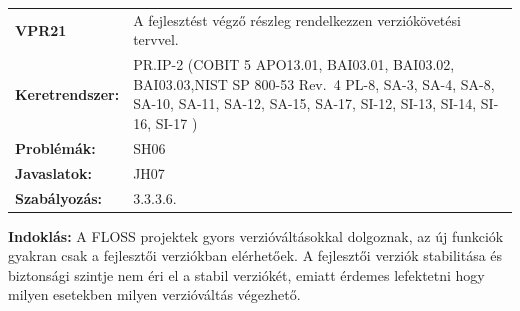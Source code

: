 \documentclass[12pt,magyar,a4paper,oneside]{scrreprt}
\begin{document}
\begin{longtable}[]{@{}ll@{}}
\toprule
\endhead
\begin{minipage}[t]{0.16\columnwidth}\raggedright
\textbf{VPR21}\strut
\end{minipage} & \begin{minipage}[t]{0.79\columnwidth}\raggedright
A fejlesztést végző részleg rendelkezzen verziókövetési tervvel.\strut
\end{minipage}\tabularnewline
\begin{minipage}[t]{0.16\columnwidth}\raggedright
\textbf{Keretrendszer:}\strut
\end{minipage} & \begin{minipage}[t]{0.79\columnwidth}\raggedright
PR.IP-2 (COBIT 5 APO13.01, BAI03.01, BAI03.02, BAI03.03,NIST SP 800-53
Rev.~4 PL-8, SA-3, SA-4, SA-8, SA-10, SA-11, SA-12, SA-15, SA-17, SI-12,
SI-13, SI-14, SI-16, SI-17 )\strut
\end{minipage}\tabularnewline
\begin{minipage}[t]{0.16\columnwidth}\raggedright
\textbf{Problémák:}\strut
\end{minipage} & \begin{minipage}[t]{0.79\columnwidth}\raggedright
SH06\strut
\end{minipage}\tabularnewline
\begin{minipage}[t]{0.16\columnwidth}\raggedright
\textbf{Javaslatok:}\strut
\end{minipage} & \begin{minipage}[t]{0.79\columnwidth}\raggedright
JH07\strut
\end{minipage}\tabularnewline
\begin{minipage}[t]{0.16\columnwidth}\raggedright
\textbf{Szabályozás:}\strut
\end{minipage} & \begin{minipage}[t]{0.79\columnwidth}\raggedright
3.3.3.6.\strut
\end{minipage}\tabularnewline
\bottomrule
\end{longtable}

\textbf{Indoklás: } A FLOSS projektek gyors verzióváltásokkal dolgoznak,
az új funkciók gyakran csak a fejlesztői verziókban elérhetőek. A
fejlesztői verziók stabilitása és biztonsági szintje nem éri el a stabil
verziókét, emiatt érdemes lefektetni hogy milyen esetekben milyen
verzióváltás végezhető.
\end{document}
